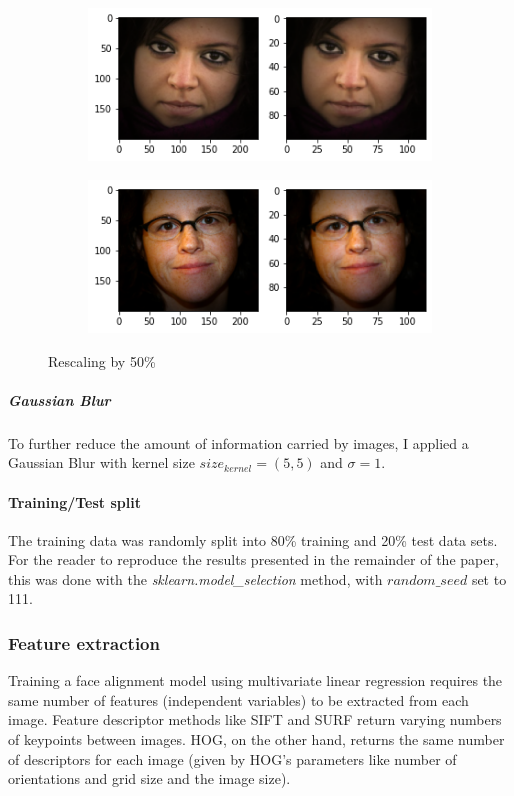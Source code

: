 \documentclass{article}
\begin{document}
\begin{figure}[h]
  \begin{subfigure}[b]{0.49\textwidth}
    \includegraphics[width=\textwidth]{rescale1}
  \end{subfigure}
  \hfill
  \begin{subfigure}[b]{0.49\textwidth}
    \includegraphics[width=\textwidth]{rescale5}
  \end{subfigure}
  \hfill
  \caption{Rescaling by 50\%}
  \label{fig:rescale}
\end{figure}

\subparagraph{Gaussian Blur} To further reduce the amount of information carried by images, I applied a Gaussian Blur with kernel size $size_{kernel}=(5,5)$ and $\sigma=1$.

\paragraph{Training/Test split}
The training data was randomly split into 80\% training and 20\% test data sets. For the reader to reproduce the results presented in the remainder of the paper, this was done with the \emph{sklearn.model\_selection} method, with $random\_seed$ set to 111.

\subsubsection{Feature extraction}\label{section:feat-extr}
Training a face alignment model using multivariate linear regression requires the same number of features (independent variables) to be extracted from each image. Feature descriptor methods like SIFT and SURF return varying numbers of keypoints between images. HOG, on the other hand, returns the same number of descriptors for each image (given by HOG's parameters like number of orientations and grid size and the image size).
\end{document}
